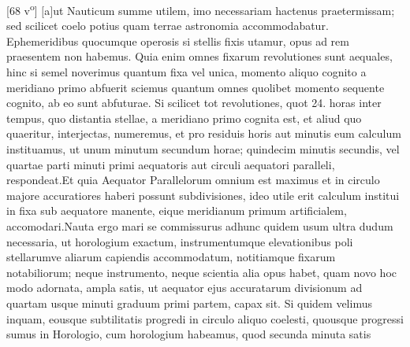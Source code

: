 [68 v\textsuperscript{o}] $\lbrack$a$\rbrack$ut Nauticum summe utilem, imo necessariam hactenus praetermissam; sed scilicet coelo potius quam terrae astronomia accommodabatur. Ephemeridibus\protect{} quocumque operosis si stellis fixis\protect{} utamur, opus ad rem praesentem non habemus. Quia enim omnes fixarum\protect{} revolutiones sunt aequales, hinc si semel noverimus quantum fixa\protect{} vel unica, momento aliquo cognito a meridiano\protect{} primo abfuerit sciemus quantum omnes quolibet momento sequente cognito, ab eo sunt abfuturae. Si scilicet tot revolutiones, quot 24. horas inter tempus, quo distantia stellae\protect{}, a meridiano \protect{} primo cognita est, et aliud quo quaeritur,  interjectas, numeremus, et pro residuis horis aut minutis eum calculum instituamus, ut unum minutum secundum horae; quindecim minutis secundis, vel quartae parti minuti primi aequatoris\protect{} aut circuli aequatori\protect{} paralleli, respondeat.\pend \pstart Et quia Aequator\protect{} Parallelorum\protect{} omnium est maximus et in circulo majore accuratiores haberi possunt subdivisiones, ideo utile erit calculum institui in fixa sub aequatore\protect{} manente, eique meridianum\protect{}  primum artificialem, accomodari.\pend \pstart Nauta ergo mari se commissurus adhunc quidem usum ultra dudum necessaria, ut horologium\protect{} exactum, instrumentumque elevationibus poli\protect{} stellarumve\protect{} aliarum capiendis accommodatum, notitiamque fixarum\protect{} notabiliorum; neque instrumento, neque scientia alia opus habet, quam   novo hoc modo adornata,  ampla satis, ut aequator\protect{} ejus accuratarum divisionum ad quartam usque minuti graduum primi partem,  capax sit. Si quidem velimus inquam, eousque subtilitatis progredi in circulo aliquo coelesti, quousque progressi sumus in Horologio\protect{}, cum horologium\protect{} habeamus, quod secunda minuta satis 